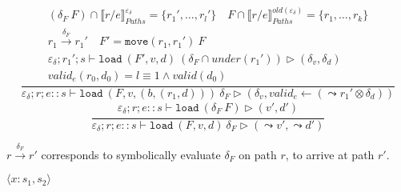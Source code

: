 \documentclass{report}
\theoremstyle{theorem}
\begin{document}
\begin{displaymath}
	\frac{\begin{array}{c}
		(\delta_F~F) \cap \llbracket r/e \rrbracket^{\varepsilon_\delta}_{Paths} = \{r_1',\dots,r_l'\} \quad
		F \cap \llbracket r/e \rrbracket^{old(\varepsilon_\delta)}_{Paths} = \{r_1,\dots,r_k\} \\
		r_1 \xrightarrow{\delta_F} r_1' \quad F' = \mathtt{move}(r_1,r_1')~F \\
		\varepsilon_\delta ; r_1' ; s \vdash \mathtt{load}~ (F',v,d)~ (\delta_F \cap under(r_1')) \rhd (\delta_v,\delta_d)\\
		valid_{e} (r_0,d_0) = l \equiv 1 \wedge valid(d_0)
	\end{array}}
	{\varepsilon_\delta ; r ; e::s \vdash \mathtt{load}~ (F,v,(b,(r_1,d)))~ \delta_F \rhd (\delta_v,valid_{e} \leftarrow (\leadsto r_1' \otimes \delta_d))}
\end{displaymath}
\begin{displaymath}
	\frac{\begin{array}{c}
		\varepsilon_\delta;r;e :: s \vdash \mathtt{load}~ (\delta_F~F) \rhd (v',d')
	\end{array}}
	{\varepsilon_\delta ; r ; e::s \vdash \mathtt{load}~ (F,v,d)~ \delta_F \rhd (\leadsto v',\leadsto d')}
\end{displaymath}

$r \xrightarrow{\delta_F} r'$ corresponds to symbolically evaluate $\delta_F$ on path $r$, to arrive at path $r'$.

$\boxed{\langle x : s_1, s_2 \rangle}$
\end{document}
